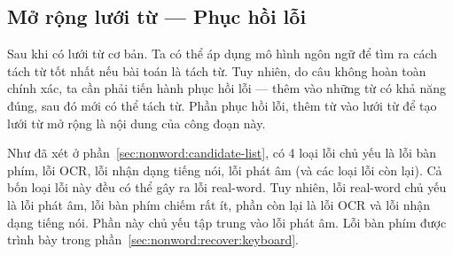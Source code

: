 \documentclass[a4paper,oneside,14pt]{extbook} %
\begin{document}




\subsection{Mở rộng lưới từ  --- Phục hồi lỗi}
\label{sec:realword:recover}

Sau khi có lưới từ cơ bản. Ta có thể áp dụng mô hình ngôn ngữ để tìm
ra cách tách từ tốt nhất nếu bài toán là tách từ. Tuy nhiên, do câu
không hoàn toàn chính xác, ta cần phải tiến hành phục hồi lỗi --- thêm
vào những từ có khả năng đúng, sau đó mới có thể tách từ. Phần phục
hồi lỗi, thêm từ vào lưới từ để tạo lưới từ mở rộng là nội dung của
công đoạn này.

Như đã xét ở phần~\ref{sec:nonword:candidate-list}, có 4 loại lỗi chủ
yếu là lỗi bàn phím, lỗi OCR, lỗi nhận dạng tiếng nói, lỗi phát âm (và
các loại lỗi còn lại). Cả bốn loại lỗi này đều có thể gây ra lỗi
real-word. Tuy nhiên, lỗi real-word chủ yếu là lỗi phát âm, lỗi bàn
phím chiếm rất ít, phần còn lại là lỗi OCR và lỗi nhận dạng tiếng
nói. Phần này chủ yếu tập trung vào lỗi phát âm. Lỗi bàn phím được
trình bày trong phần~\ref{sec:nonword:recover:keyboard}.

\end{document}
